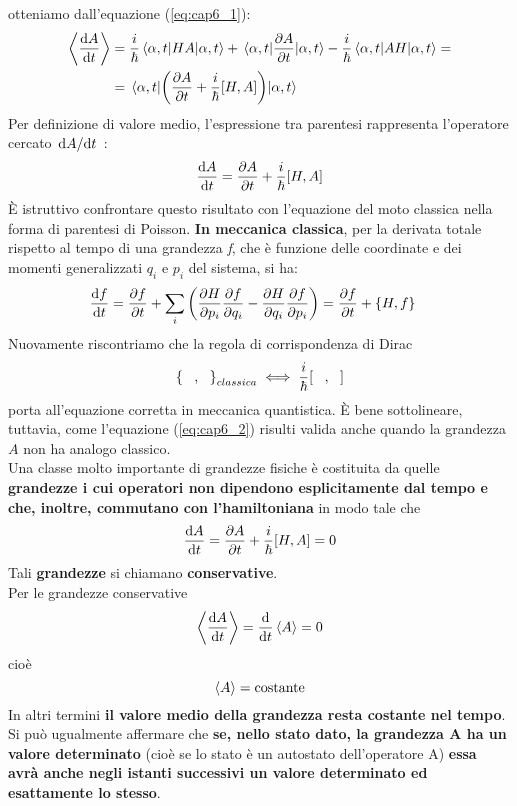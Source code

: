 \documentclass[a4paper,12pt,oneside]{book}
\begin{document}
otteniamo dall'equazione (\ref{eq:cap6_1}):
\begin{align}
  \ev{\dv{A}{t}} &= \frac{i}{\hbar}\ev{HA}{\alpha,t}+\ev{\pdv{A}{t}}{\alpha,t}-\frac{i}{\hbar}\ev{AH}{\alpha,t} =\nonumber\\
  &=\ev{\qty(\pdv{A}{t}+\frac{i}{\hbar}\comm{H}{A})}{\alpha,t}
\end{align}
Per definizione di valore medio, l'espressione tra parentesi rappresenta l'operatore cercato $\dv*{A}{t}$ :
\begin{equation}
  \label{eq:cap6_2}
  \dv{A}{t} = \pdv{A}{t}+\frac{i}{\hbar}\comm{H}{A}
\end{equation}
È istruttivo confrontare questo risultato con l'equazione del moto classica nella forma di parentesi di Poisson. \textbf{In meccanica classica}, per la derivata totale rispetto al tempo di una grandezza \emph{f}, che è funzione delle coordinate e dei momenti generalizzati $q_i$ e $p_i$ del sistema, si ha:
\begin{align}
  \label{eq:cap6_3}
  \dv{f}{t} &= \pdv{f}{t}+\sum_i\qty(\pdv{H}{p_i}\pdv{f}{q_i}-\pdv{H}{q_i}\pdv{f}{p_i}) = \pdv{f}{t} + \pb{H}{f}
\end{align}
Nuovamente riscontriamo che la regola di corrispondenza di Dirac
\begin{equation}
  \pb{\;\;\;}{\;\;\;}_{classica} \iff \frac{i}{\hbar}\comm{\;\;\;}{\;\;\;}
\end{equation}
porta all'equazione corretta in meccanica quantistica. È bene sottolineare, tuttavia, come l'equazione (\ref{eq:cap6_2}) risulti valida anche quando la grandezza $A$ non ha analogo classico.\\
Una classe molto importante di grandezze fisiche è costituita da quelle \textbf{grandezze i cui operatori non dipendono esplicitamente dal tempo e che, inoltre, commutano con l'hamiltoniana} in modo tale che
\begin{equation}
  \dv{A}{t} = \pdv{A}{t} + \frac{i}{\hbar}\comm{H}{A} = 0
\end{equation}
Tali \textbf{grandezze} si chiamano \textbf{conservative}.\\
Per le grandezze conservative
\begin{equation}
  \ev{\dv{A}{t}}=\dv{t}\ev{A} = 0
\end{equation}
cioè
\begin{equation}
  \ev{A} = \text{costante}
\end{equation}
In altri termini \textbf{il valore medio della grandezza resta costante nel tempo}. Si può ugualmente affermare che \textbf{se, nello stato dato, la grandezza A ha un valore determinato} (cioè se lo stato è un autostato dell'operatore A) \textbf{essa avrà anche negli istanti successivi un valore determinato ed esattamente lo stesso}.\\
\end{document}
